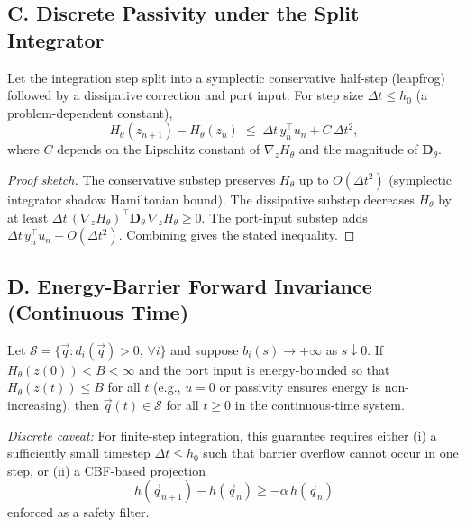 \subsection*{C. Discrete Passivity under the Split Integrator}

\begin{theorem}
\label{thm:discrete_passivity}
Let the integration step split into a symplectic conservative half-step
(leapfrog) followed by a dissipative correction and port input.
For step size $\Delta t \leq h_0$ (a problem-dependent constant),
\[
  H_\theta(z_{n+1}) - H_\theta(z_n)
  \;\leq\;
  \Delta t\, y_n^\top u_n + C\,\Delta t^2,
\]
where $C$ depends on the Lipschitz constant of $\nabla_z H_\theta$ and the
magnitude of $\mathbf{D}_\theta$.
\end{theorem}

\begin{proof}[Proof sketch]
The conservative substep preserves $H_\theta$ up to $O(\Delta t^2)$
(symplectic integrator shadow Hamiltonian bound).
The dissipative substep decreases $H_\theta$ by at least
$\Delta t \,(\nabla_z H_\theta)^\top \mathbf{D}_\theta\,\nabla_z H_\theta \geq 0$.
The port-input substep adds $\Delta t\, y_n^\top u_n + O(\Delta t^2)$.
Combining gives the stated inequality.
\end{proof}

\subsection*{D. Energy-Barrier Forward Invariance (Continuous Time)}

\begin{theorem}
\label{thm:barrier_safety}
Let $\mathcal{S} = \{\vec{q} : d_i(\vec{q}) > 0,\, \forall i\}$ and
suppose $b_i(s) \to +\infty$ as $s \downarrow 0$.
If $H_\theta(z(0)) < B < \infty$ and the port input is energy-bounded so
that $H_\theta(z(t)) \leq B$ for all $t$ (e.g., $u = 0$ or passivity
ensures energy is non-increasing), then $\vec{q}(t) \in \mathcal{S}$ for
all $t \geq 0$ in the continuous-time system.

\emph{Discrete caveat:} For finite-step integration, this guarantee requires
either (i) a sufficiently small timestep $\Delta t \leq h_0$ such that
barrier overflow cannot occur in one step, or (ii) a CBF-based projection
\[
  h(\vec{q}_{n+1}) - h(\vec{q}_n) \geq -\alpha\, h(\vec{q}_n)
\]
enforced as a safety filter.
\end{theorem}

